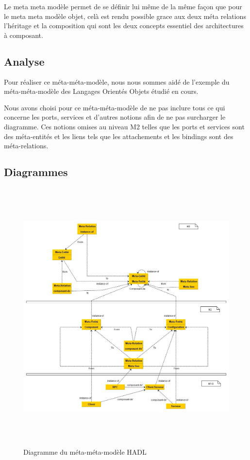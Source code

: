 \documentclass[11pt,a4paper]{article}
\begin{document}
Le meta meta modèle permet de se définir lui même de la même façon que pour le meta meta modèle objet, celà est rendu possible grace aux deux méta relations l'héritage et la composition qui sont les deux concepts essentiel des architectures à composant.

\subsection{Analyse}
Pour réaliser ce méta-méta-modèle, nous nous sommes aidé de l'exemple du
méta-méta-modèle des Langages Orientés Objets étudié en cours. 

Nous avons choisi pour ce méta-méta-modèle de ne pas inclure tous ce qui concerne
les ports, services et d'autres notions afin de ne pas surcharger le diagramme.
Ces notions omises au niveau M2 telles que les ports et services sont des
méta-entités et les liens tels que les attachements et les bindings sont des
méta-relations.
\subsection{Diagrammes}

\begin{figure}[h]
  		\centering
  		\includegraphics[height=14cm,width=15cm]{meta-meta-modele.jpg}
  		\caption{Diagramme du méta-méta-modèle HADL}
  		\label{Diagramme du méta-méta-modèle HADL}
\end{figure}
\end{document}
